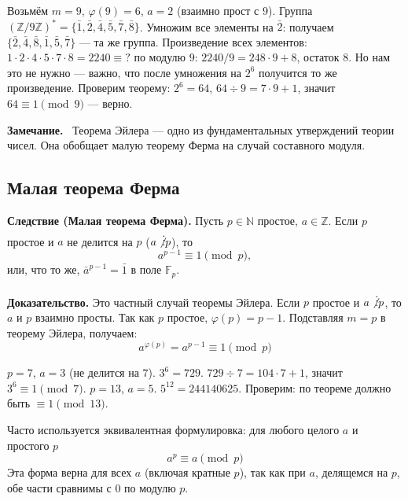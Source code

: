 \documentclass[a4paper,12pt]{article}
\newcommand{\myremark}{\textbf{Замечание.}\ }
\theoremstyle{definition}
\theoremstyle{plain}
\theoremstyle{remark}
\begin{document}
	\begin{tcolorbox}[colback=gray!5, colframe=gray!50, title=Пример]
		Возьмём $m = 9$, $\varphi(9) = 6$, $a = 2$ (взаимно прост с $9$).
		Группа $(\mathbb{Z}/9\mathbb{Z})^* = \{\bar{1}, \bar{2}, \bar{4}, \bar{5}, \bar{7}, \bar{8}\}$.
		Умножим все элементы на $\bar{2}$: получаем $\{\bar{2}, \bar{4}, \bar{8}, \bar{1}, \bar{5}, \bar{7}\}$ — та же группа.
		Произведение всех элементов: $1 \cdot 2 \cdot 4 \cdot 5 \cdot 7 \cdot 8 = 2240 \equiv ?$ по модулю $9$: $2240/9 = 248\cdot9 + 8$, остаток $8$. Но нам это не нужно — важно, что после умножения на $2^6$ получится то же произведение.
		Проверим теорему: $2^6 = 64$, $64 \div 9 = 7\cdot9 + 1$, значит $64 \equiv 1 \pmod{9}$ — верно.
	\end{tcolorbox}
	
	\myremark
	Теорема Эйлера — одно из фундаментальных утверждений теории чисел. Она обобщает малую теорему Ферма на случай составного модуля.
	
	\subsection{Малая теорема Ферма}
	
	\noindent \textbf{Следствие (Малая теорема Ферма).}
	Пусть $p \in \mathbb{N}$ простое, $a \in \mathbb{Z}$. Если $p$ простое и $a$ не делится на $p$ ($a \not\vdots p$), то
	\[
	a^{p-1} \equiv 1 \pmod{p},
	\]
	или, что то же, $\bar{a}^{p-1} = \bar{1}$ в поле $\mathbb{F}_p$.
	
	\medskip
	\noindent \textbf{Доказательство.}
	Это частный случай теоремы Эйлера. Если $p$ простое и $a \not\vdots p$, то $a$ и $p$ взаимно просты. Так как $p$ простое, $\varphi(p) = p - 1$. Подставляя $m = p$ в теорему Эйлера, получаем:
	\[
	a^{\varphi(p)} = a^{p-1} \equiv 1 \pmod{p}
	\]
	
	\begin{tcolorbox}[colback=blue!5, colframe=blue!40!black, title=Пример]
		$p = 7$, $a = 3$ (не делится на $7$). $3^{6} = 729$. $729 \div 7 = 104\cdot7 + 1$, значит $3^6 \equiv 1 \pmod{7}$.
		$p = 13$, $a = 5$. $5^{12} = 244140625$. Проверим: по теореме должно быть $\equiv 1 \pmod{13}$.
	\end{tcolorbox}
	
	\begin{tcolorbox}[colback=red!5, colframe=red!70!black, title=Другая форма малой теоремы Ферма]
		Часто используется эквивалентная формулировка: для любого целого $a$ и простого $p$
		\[
		a^p \equiv a \pmod{p}
		\]
		Эта форма верна для всех $a$ (включая кратные $p$), так как при $a$, делящемся на $p$, обе части сравнимы с $0$ по модулю $p$.
	\end{tcolorbox}
	
\end{document}
